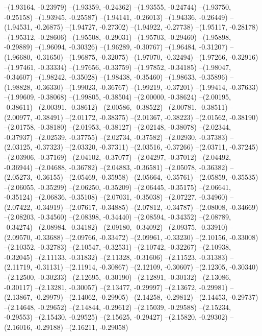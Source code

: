 --(1.93164, -0.23979)
--(1.93359, -0.24362)
--(1.93555, -0.24744)
--(1.93750, -0.25158)
--(1.93945, -0.25587)
--(1.94141, -0.26013)
--(1.94336, -0.26449)
--(1.94531, -0.26875)
--(1.94727, -0.27302)
--(1.94922, -0.27738)
--(1.95117, -0.28178)
--(1.95312, -0.28606)
--(1.95508, -0.29031)
--(1.95703, -0.29460)
--(1.95898, -0.29889)
--(1.96094, -0.30326)
--(1.96289, -0.30767)
--(1.96484, -0.31207)
--(1.96680, -0.31650)
--(1.96875, -0.32075)
--(1.97070, -0.32494)
--(1.97266, -0.32916)
--(1.97461, -0.33334)
--(1.97656, -0.33759)
--(1.97852, -0.34185)
--(1.98047, -0.34607)
--(1.98242, -0.35028)
--(1.98438, -0.35460)
--(1.98633, -0.35896)
--(1.98828, -0.36330)
--(1.99023, -0.36767)
--(1.99219, -0.37201)
--(1.99414, -0.37633)
--(1.99609, -0.38068)
--(1.99805, -0.38504)
--(2.00000, -0.38624)
--(2.00195, -0.38611)
--(2.00391, -0.38612)
--(2.00586, -0.38522)
--(2.00781, -0.38511)
--(2.00977, -0.38491)
--(2.01172, -0.38375)
--(2.01367, -0.38223)
--(2.01562, -0.38190)
--(2.01758, -0.38180)
--(2.01953, -0.38127)
--(2.02148, -0.38078)
--(2.02344, -0.37937)
--(2.02539, -0.37755)
--(2.02734, -0.37582)
--(2.02930, -0.37383)
--(2.03125, -0.37323)
--(2.03320, -0.37311)
--(2.03516, -0.37266)
--(2.03711, -0.37245)
--(2.03906, -0.37169)
--(2.04102, -0.37077)
--(2.04297, -0.37012)
--(2.04492, -0.36944)
--(2.04688, -0.36782)
--(2.04883, -0.36581)
--(2.05078, -0.36382)
--(2.05273, -0.36155)
--(2.05469, -0.35958)
--(2.05664, -0.35761)
--(2.05859, -0.35535)
--(2.06055, -0.35299)
--(2.06250, -0.35209)
--(2.06445, -0.35175)
--(2.06641, -0.35124)
--(2.06836, -0.35108)
--(2.07031, -0.35038)
--(2.07227, -0.34960)
--(2.07422, -0.34919)
--(2.07617, -0.34885)
--(2.07812, -0.34787)
--(2.08008, -0.34669)
--(2.08203, -0.34560)
--(2.08398, -0.34440)
--(2.08594, -0.34352)
--(2.08789, -0.34274)
--(2.08984, -0.34182)
--(2.09180, -0.34092)
--(2.09375, -0.33910)
--(2.09570, -0.33688)
--(2.09766, -0.33472)
--(2.09961, -0.33230)
--(2.10156, -0.33008)
--(2.10352, -0.32783)
--(2.10547, -0.32531)
--(2.10742, -0.32267)
--(2.10938, -0.32045)
--(2.11133, -0.31832)
--(2.11328, -0.31606)
--(2.11523, -0.31383)
--(2.11719, -0.31131)
--(2.11914, -0.30867)
--(2.12109, -0.30607)
--(2.12305, -0.30340)
--(2.12500, -0.30233)
--(2.12695, -0.30190)
--(2.12891, -0.30132)
--(2.13086, -0.30117)
--(2.13281, -0.30057)
--(2.13477, -0.29997)
--(2.13672, -0.29981)
--(2.13867, -0.29979)
--(2.14062, -0.29905)
--(2.14258, -0.29812)
--(2.14453, -0.29737)
--(2.14648, -0.29652)
--(2.14844, -0.29612)
--(2.15039, -0.29588)
--(2.15234, -0.29553)
--(2.15430, -0.29525)
--(2.15625, -0.29427)
--(2.15820, -0.29302)
--(2.16016, -0.29188)
--(2.16211, -0.29058)
